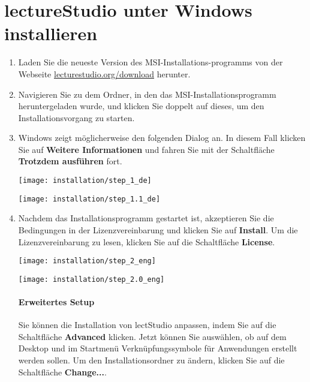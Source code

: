 \section{lectureStudio unter Windows installieren}
\begin{enumerate}
	\item Laden Sie die neueste Version des \lectStudio{} MSI-Installations-programms von der Webseite \href{https://www.lecturestudio.org/download}{lecturestudio.org/download} herunter.
	\item Navigieren Sie zu dem Ordner, in den das MSI-Installationsprogramm heruntergeladen wurde, und klicken Sie doppelt auf dieses, um den Installationsvorgang zu starten.
	\item Windows zeigt möglicherweise den folgenden Dialog an. In diesem Fall klicken Sie auf \textbf{Weitere Informationen} und fahren Sie mit der Schaltfläche \textbf{Trotzdem ausführen} fort.

	\begin{minipage}{0.46\textwidth}
		\texttt{[image: installation/step\_1\_de]}
	\end{minipage}
	\begin{minipage}{0.46\textwidth}
		\texttt{[image: installation/step\_1.1\_de]}
	\end{minipage}
	\item Nachdem das Installationsprogramm gestartet ist, akzeptieren Sie die Bedingungen in der Lizenzvereinbarung und klicken Sie auf \textbf{Install}. Um die Lizenzvereinbarung zu lesen, klicken Sie auf die Schaltfläche \textbf{License}.

	\begin{minipage}[t][][b]{0.46\textwidth}
		\texttt{[image: installation/step\_2\_eng]}
	\end{minipage}
	\begin{minipage}[t][][b]{0.46\textwidth}
		\texttt{[image: installation/step\_2.0\_eng]}
	\end{minipage}

	\paragraph{Erweitertes Setup}
	Sie können die Installation von lectStudio anpassen, indem Sie auf die Schaltfläche \textbf{Advanced} klicken. Jetzt können Sie auswählen, ob auf dem Desktop und im Startmenü Verknüpfungssymbole für Anwendungen erstellt werden sollen. Um den Installationsordner zu ändern, klicken Sie auf die Schaltfläche \textbf{Change...}.


\end{enumerate}
